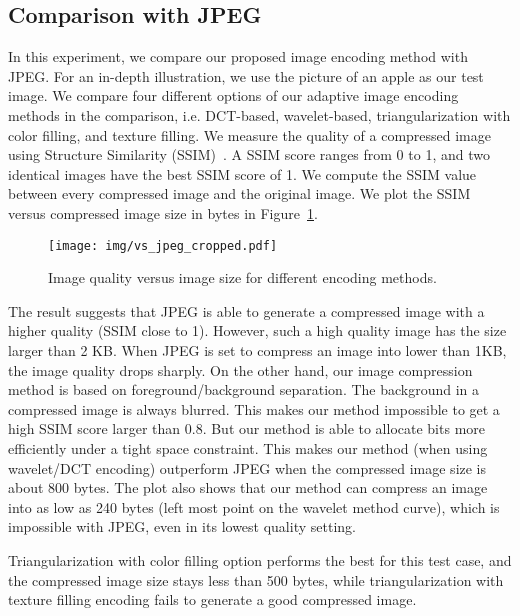 \subsection{Comparison with JPEG}


In this experiment, we compare our proposed image encoding method with JPEG. For an in-depth illustration, we use the picture of an apple as our test image. We compare four different options of our adaptive image encoding methods in the comparison, i.e. DCT-based, wavelet-based, triangularization with color filling, and texture filling. We measure the quality of a compressed image using Structure Similarity (SSIM)~\cite{wang2004image}. A SSIM score ranges from 0 to 1, and two identical images have the best SSIM score of 1. We compute the SSIM value between every compressed image and the original image. We plot the SSIM versus compressed image size in bytes in Figure~\ref{fig:vs_jpeg}.

\begin{figure}[!htb]
	\begin{center}
		\texttt{[image: img/vs\_jpeg\_cropped.pdf]}
		\caption{Image quality versus image size for different encoding methods.}
		\label{fig:vs_jpeg}
	\end{center}
\end{figure}

The result suggests that JPEG is able to generate a compressed image with a higher quality (SSIM close to 1). However, such a high quality image has the size larger than 2 KB. When JPEG is set to compress an image into lower than 1KB, the image quality drops sharply. On the other hand, our image compression method is based on foreground/background separation. The background in a compressed image is always blurred. This makes our method impossible to get a high SSIM score larger than 0.8. But our method is able to allocate bits more efficiently under a tight space constraint. This makes our method (when using wavelet/DCT encoding) outperform JPEG when the compressed image size is about 800 bytes. The plot also shows that our method can compress an image into as low as 240 bytes (left most point on the wavelet method curve), which is impossible with JPEG, even in its lowest quality setting.

Triangularization with color filling option performs the best for this test case, and the compressed image size stays less than 500 bytes, while triangularization with texture filling encoding fails to generate a good compressed image.

